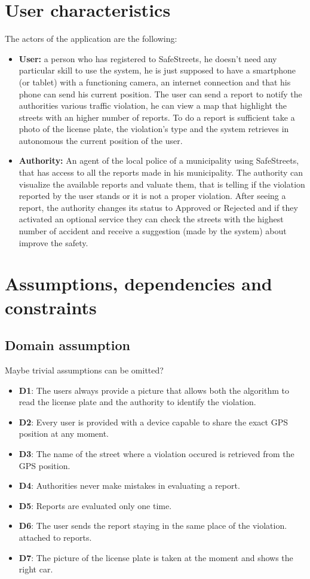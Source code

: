 \documentclass[12pt,a4paper]{report}
\begin{document}
	\section{User characteristics}
		The actors of the application are the following:
		\begin{itemize}
			\item \textbf{User:}
				a person who has registered to SafeStreets, he doesn't need any particular skill to use the system, 
				he is just supposed to have a smartphone (or tablet) with a functioning camera, an internet connection and
				that his phone can send his current position. The user can send a report to notify the authorities various traffic
				violation, he can view a map that highlight the streets with an higher number of reports. To do a report is sufficient
				take a photo of the license plate, the violation's type and the system retrieves in autonomous the current position
				of the user.
			\item \textbf{Authority:}
				An agent of the local police of a municipality using SafeStreets, that has access to all the reports made
				 in his municipality. The authority can visualize the available reports and valuate them, that is telling if the
				violation reported by the user stands or it is not a proper violation. After seeing a report, the authority 
				changes its status to Approved or Rejected and if they activated
				an optional service they can check the streets with the highest number of accident and receive
				a suggestion (made by the system) about improve the safety.
		\end{itemize}
	\section{Assumptions, dependencies and constraints}
	\subsection{Domain assumption}
Maybe trivial assumptions can be omitted?
		\begin{itemize}
			\item \textbf{D1}: The users always provide a picture that allows both the algorithm to read the license plate and
					        the authority to identify the violation.
			\item \textbf{D2}: Every user is provided with a device capable to share the exact GPS position at any moment.
			\item \textbf{D3}: The name of the street where a violation occured is retrieved from the GPS position.
			\item \textbf{D4}: Authorities never make mistakes in evaluating a report.
			\item \textbf{D5}: Reports are evaluated only one time.
			\item \textbf{D6}: The user sends the report staying in the same place of the violation. attached to reports.
			\item \textbf{D7}: The picture of the license plate is taken at the moment and shows the right car.
		\end{itemize}
\end{document}
